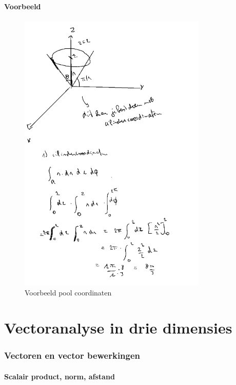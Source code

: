 \documentclass[a4paper]{report}
\begin{document}
\subsubsection{Voorbeeld}


\begin{figure}[H]
	\centering
	\includegraphics[width=0.8\textwidth]{assets/voorbeeld_pool_coordinaten.png}
	\caption{Voorbeeld pool coordinaten}
	\label{fig:voorbeeld_pool_coordinaten}
\end{figure}

\chapter{Vectoranalyse in drie dimensies }

\subsection{Vectoren en vector bewerkingen}

\subsubsection{Scalair product, norm, afstand}
\end{document}
